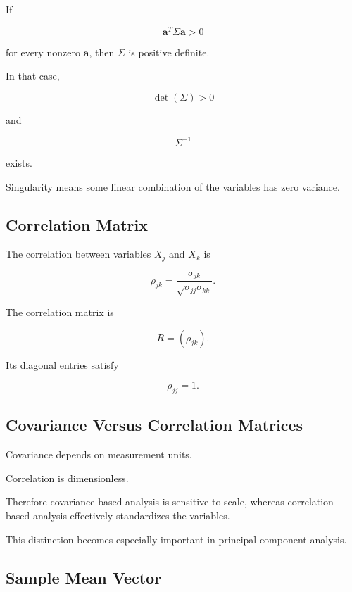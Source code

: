 If

\[
\mathbf{a}^T
\Sigma
\mathbf{a}>0
\]

for every nonzero \(\mathbf{a}\), then \(\Sigma\) is positive definite.

In that case,

\[
\boxed{
\det(\Sigma)>0
}
\]

and

\[
\boxed{
\Sigma^{-1}
}
\]

exists.

Singularity means some linear combination of the variables has zero
variance.

\subsection{Correlation Matrix}
\label{subsec:multivariate-correlation-matrix}

The correlation between variables \(X_j\) and \(X_k\) is

\[
\boxed{
\rho_{jk}
=
\frac{
\sigma_{jk}
}{
\sqrt{
\sigma_{jj}\sigma_{kk}
}
}.
}
\]

The correlation matrix is

\[
\boxed{
R
=
(\rho_{jk}).
}
\]

Its diagonal entries satisfy

\[
\boxed{
\rho_{jj}=1.
}
\]

\subsection{Covariance Versus Correlation Matrices}
\label{subsec:covariance-versus-correlation-matrix}

Covariance depends on measurement units.

Correlation is dimensionless.

Therefore covariance-based analysis is sensitive to scale, whereas
correlation-based analysis effectively standardizes the variables.

This distinction becomes especially important in principal component
analysis.

\subsection{Sample Mean Vector}
\label{subsec:sample-mean-vector}

